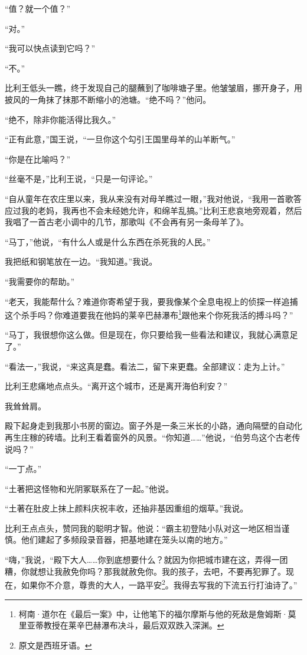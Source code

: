 \documentclass[AutoFakeBold=true]{book}
\begin{document}
``值？就一个值？''

``对。''

``我可以快点读到它吗？''

``不。''

比利王低头一瞧，终于发现自己的腿蘸到了咖啡塘子里。他皱皱眉，挪开身子，用披风的一角抹了抹那不断缩小的池塘。``绝不吗？''他问。

``绝不，除非你能活得比我久。''

``正有此意，''国王说，``一旦你这个勾引王国里母羊的山羊断气。''

``你是在比喻吗？''

``丝毫不是，''比利王说，``只是一句评论。''

``自从童年在农庄里以来，我从来没有对母羊瞧过一眼，''我对他说，``我用一首歌答应过我的老妈，我再也不会未经她允许，和绵羊乱搞。''比利王悲哀地旁观着，然后我唱了一首古老小调中的几节，那歌叫《不会再有另一条母羊了》。

``马丁，''他说，``有什么人或是什么东西在杀死我的人民。''

我把纸和钢笔放在一边。``我知道。''我说。

``我需要你的帮助。''

``老天，我能帮什么？难道你寄希望于我，要我像某个全息电视上的侦探一样追捕这个杀手吗？你难道要我在他妈的莱辛巴赫瀑布\footnote{柯南·道尔在《最后一案》中，让他笔下的福尔摩斯与他的死敌是詹姆斯·莫里亚蒂教授在莱辛巴赫瀑布决斗，最后双双跌入深渊。}跟他来个你死我活的搏斗吗？''

``马丁，我很想你这么做。但是现在，你只要给我一些看法和建议，我就心满意足了。''

``看法一，''我说，``来这真是蠢。看法二，留下来更蠢。全部建议：走为上计。''

比利王悲痛地点点头。``离开这个城市，还是离开海伯利安？''

我耸耸肩。

殿下起身走到我那小书房的窗边。窗子外是一条三米长的小路，通向隔壁的自动化再生庄稼的砖墙。比利王看着窗外的风景。``你知道……''他说，``伯劳鸟这个古老传说吗？''

``一丁点。''

``土著把这怪物和光阴冢联系在了一起。''他说。

``土著在肚皮上抹上颜料庆祝丰收，还抽非基因重组的烟草。''我说。

比利王点点头，赞同我的聪明才智。他说：``霸主初登陆小队对这一地区相当谨慎。他们建起了多频段录音器，把基地建在笼头以南的地方。''

``嗨，''我说，``殿下大人……你到底想要什么？就因为你把城市建在这，弄得一团糟，你就想让我赦免你吗？那我就赦免你。我的孩子，去吧，不要再犯罪了。现在，如果你不介意，尊贵的大人，一路平安\footnote{原文是西班牙语。}。我得去写我的下流五行打油诗了。''
\end{document}
